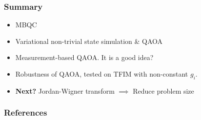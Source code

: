 \documentclass{beamer}
\theoremstyle{definition}
\begin{document}


\begin{frame}
\frametitle{Summary}


\begin{itemize}
	\item MBQC
	\item Variational non-trivial state simulation \& QAOA
	\item Measurement-based QAOA. It is a good idea?
	\item Robustness of QAOA, tested on TFIM with non-constant $g_i$.
	
	\pause
	
	\item \textbf{Next?} Jordan-Wigner transform $\implies$ Reduce problem size 
\end{itemize}


\end{frame}




\begin{frame}[allowframebreaks]
\frametitle{References}




{}



\end{frame}
\end{document}
